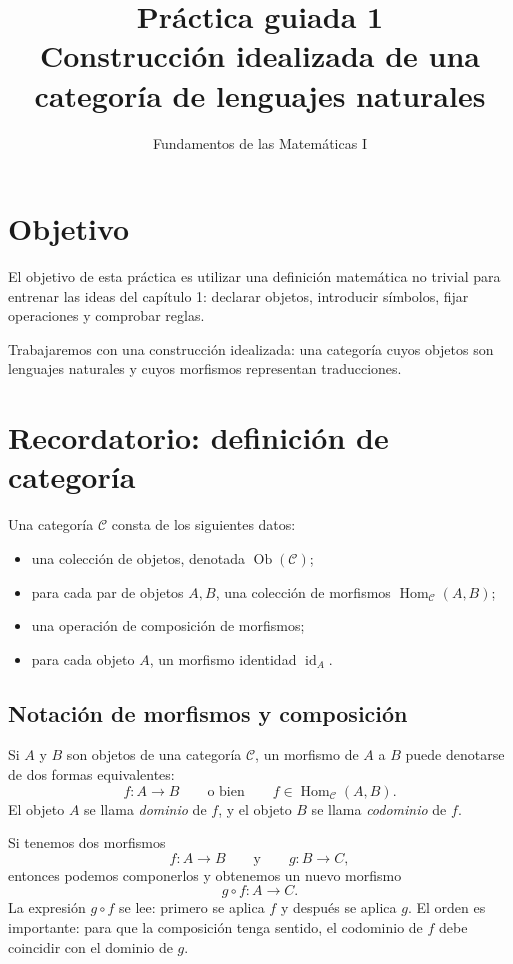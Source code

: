 \documentclass[11pt,a4paper]{article}
\title{\textbf{Práctica guiada 1}\\
Construcción idealizada de una categoría de lenguajes naturales}
\author{Fundamentos de las Matemáticas I}
\date{}
\newcommand{\Ob}{\operatorname{Ob}}
\newcommand{\Hom}{\operatorname{Hom}}
\newcommand{\id}{\operatorname{id}}
\begin{document}
\maketitle

\section*{Objetivo}

El objetivo de esta práctica es utilizar una definición matemática no trivial
para entrenar las ideas del capítulo 1: declarar objetos, introducir símbolos,
fijar operaciones y comprobar reglas.

Trabajaremos con una construcción idealizada: una categoría cuyos objetos son
lenguajes naturales y cuyos morfismos representan traducciones.

\section*{Recordatorio: definición de categoría}

Una categoría \(\mathcal{C}\) consta de los siguientes datos:

\begin{itemize}
  \item una colección de objetos, denotada \(\Ob(\mathcal{C})\);
  \item para cada par de objetos \(A,B\), una colección de morfismos
        \(\Hom_{\mathcal{C}}(A,B)\);
  \item una operación de composición de morfismos;
  \item para cada objeto \(A\), un morfismo identidad \(\id_A\).
\end{itemize}

\subsection*{Notación de morfismos y composición}

Si \(A\) y \(B\) son objetos de una categoría \(\mathcal{C}\), un morfismo de
\(A\) a \(B\) puede denotarse de dos formas equivalentes:
\[
  f:A\to B
  \qquad\text{o bien}\qquad
  f\in \Hom_{\mathcal{C}}(A,B).
\]
El objeto \(A\) se llama \emph{dominio} de \(f\), y el objeto \(B\) se llama
\emph{codominio} de \(f\).

Si tenemos dos morfismos
\[
  f:A\to B
  \qquad\text{y}\qquad
  g:B\to C,
\]
entonces podemos componerlos y obtenemos un nuevo morfismo
\[
  g\circ f:A\to C.
\]
La expresión \(g\circ f\) se lee: primero se aplica \(f\) y después se aplica
\(g\). El orden es importante: para que la composición tenga sentido, el
codominio de \(f\) debe coincidir con el dominio de \(g\).
\end{document}
